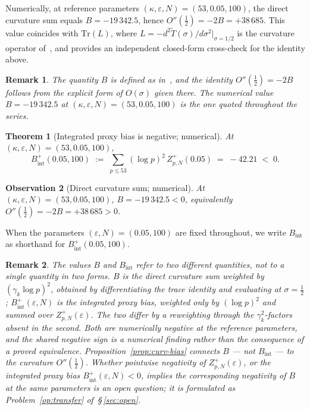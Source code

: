 \documentclass[11pt]{article}
\newtheorem{theorem}{Theorem}[section]
\newtheorem{observation}[theorem]{Observation}
\newtheorem*{remark}{Remark}
\newcommand{\Tt}{\widetilde{T}}
\begin{document}
Numerically, at reference parameters $(\kappa,\varepsilon,N)=(53,0.05,100)$,
the direct curvature sum equals $B=-19\,342.5$, hence
$O''(\tfrac12)=-2B=+38\,685$.
This value coincides with $\mathrm{Tr}(L)$, where
$L=-d^2\Tt(\sigma)/d\sigma^2\big|_{\sigma=1/2}$ is the curvature
operator of~\cite{Paper5}, and provides an independent closed-form
cross-check for the identity above.

\begin{remark}
The quantity $B$ is defined as in~\cite[\S5]{Paper5}, and the identity
$O''(\tfrac12)=-2B$ follows from the explicit form of $O(\sigma)$
given there.
The numerical value $B=-19\,342.5$ at $(\kappa,\varepsilon,N)=(53,0.05,100)$
is the one quoted throughout the series.
\end{remark}

\begin{theorem}[Integrated proxy bias is negative; numerical]
\label{thm:intbias}
At $(\kappa,\varepsilon,N)=(53,0.05,100)$,
\[
B_{\mathrm{int}}^+(0.05,100) \;:=\; \sum_{p\le 53}(\log p)^2\,
Z_{p,N}^+(0.05) \;=\; -42.21 \;<\; 0.
\]
\end{theorem}

\begin{observation}[Direct curvature sum; numerical]
\label{obs:B}
At $(\kappa,\varepsilon,N)=(53,0.05,100)$,
$B=-19\,342.5<0$, equivalently $O''(\tfrac12)=-2B=+38\,685>0$.
\end{observation}

When the parameters $(\varepsilon,N)=(0.05,100)$ are fixed throughout,
we write $B_{\mathrm{int}}$ as shorthand for $B^+_{\mathrm{int}}(0.05,100)$.

\begin{remark}
The values $B$ and $B_{\mathrm{int}}$ refer to two \emph{different}
quantities, not to a single quantity in two forms.
$B$ is the direct curvature sum weighted by $(\gamma_k\log p)^2$,
obtained by differentiating the trace identity and evaluating at
$\sigma=\tfrac12$; $B_{\mathrm{int}}^+(\varepsilon,N)$ is the integrated proxy bias,
weighted only by $(\log p)^2$ and summed over $Z_{p,N}^+(\varepsilon)$.
The two differ by a reweighting through the $\gamma_k^2$-factors
absent in the second.
Both are numerically negative at the reference parameters, and the
shared negative sign is a numerical finding rather than the consequence
of a proved equivalence.
Proposition~\ref{prop:curv-bias} connects $B$ --- not $B_{\mathrm{int}}$
--- to the curvature $O''(\tfrac12)$.
Whether pointwise negativity of $Z_{p,N}^+(\varepsilon)$, or
the integrated proxy bias $B_{\mathrm{int}}^+(\varepsilon,N)<0$, implies the
corresponding negativity of $B$ at the same parameters is an open
question; it is formulated as Problem~\ref{op:transfer} of~\S\,\ref{sec:open}.
\end{remark}
\end{document}

